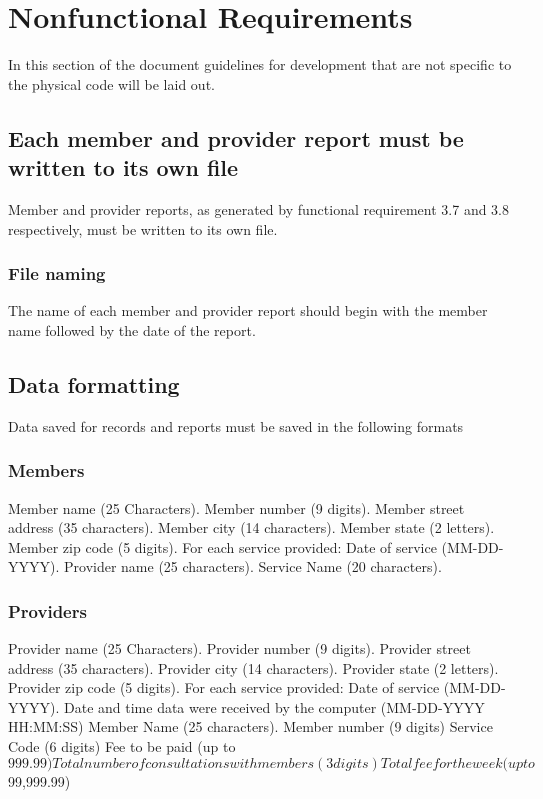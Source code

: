 \documentclass{article}
\begin{document}
\section{Nonfunctional Requirements}
In this section of the document guidelines for development that are not specific to the physical code will be laid out. 

\subsection{Each member and provider report must be written to its own file}
Member and provider reports, as generated by functional requirement 3.7 and 3.8 respectively, must be written to its own file.

\subsubsection{File naming}
The name of each member and provider report should begin with the member name followed by the date of the report.

\subsection{Data formatting}
Data saved for records and reports must be saved in the following formats
\subsubsection{Members}
Member name (25 Characters).
Member number (9 digits).
Member street address (35  characters).
Member city (14 characters).
Member state (2 letters).
Member zip code (5 digits).
For each service provided:
Date of service (MM-DD-YYYY).
Provider name (25 characters).
Service Name (20 characters).

\subsubsection{Providers}
Provider name (25 Characters).
Provider number (9 digits).
Provider street address (35  characters).
Provider city (14 characters).
Provider state (2 letters).
Provider zip code (5 digits).
For each service provided:
Date of service (MM-DD-YYYY).
Date and time data were received by the computer (MM-DD-YYYY HH:MM:SS)
Member Name (25 characters).
Member number (9 digits)
Service Code (6 digits)
Fee to be paid (up to $999.99)
Total number of consultations with members (3 digits)
Total fee for the week (up to $99,999.99)
\end{document}
